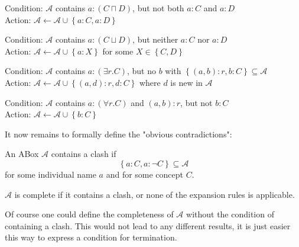 \begin{mdframed}[frametitle = expansion rules]
	\begin{mdframed}[frametitle= The $\sqcap$-rule]
		Condition: $\mathcal{A}$ contains $a: (C \sqcap D)$, but not both $a:C$ and $a:D$ \\
		Action: $\mathcal{A} \leftarrow \mathcal{A} \cup \left\{ a:C, a:D \right\} $
	\end{mdframed}
	\begin{mdframed}[frametitle= The $\sqcup$-rule]
		Condition: $\mathcal{A}$ contains $a: (C \sqcup D)$, but neither $a:C$ nor $a:D$\\
		Action: $\mathcal{A} \leftarrow \mathcal{A} \cup \left\{ a:X \right\} $ for some $X \in \left\{ C,D \right\}$
	\end{mdframed}
	\begin{mdframed}[frametitle= The $\exists$-rule]
		Condition: $\mathcal{A}$ contains $a:(\exists r.C)$, but no $b$ with $\left\{ (a,b) :r, b:C \right\} \subseteq \mathcal{A}$ \\
		Action: $\mathcal{A} \leftarrow \mathcal{A} \cup \left\{ (a,d):r, d:C \right\} $ where $d$ is new in $\mathcal{A}$
	\end{mdframed}
	\begin{mdframed}[frametitle= The $\forall$-rule]
		Condition: $\mathcal{A}$ contains $a:(\forall r.C)$ and $(a,b):r$, but not $b:C$\\
		Action: $\mathcal{A} \leftarrow \mathcal{A} \cup \left\{ b:C\right\} $
	\end{mdframed}
\end{mdframed}

It now remains to formally define the "obvious contradictions":
\begin{definition}
	An ABox $\mathcal{A}$ contains a clash if
	\[
	\left\{ a:C, a: \neg C \right\} \subseteq \mathcal{A}
	\]
	for some individual name $a$ and for some concept $C$.

	$\mathcal{A}$ is complete if it contains a clash, or none of the expansion rules is applicable.
\end{definition}
\begin{note}
	Of course one could define the completeness of $\mathcal{A}$ without the condition of containing a clash.
	This would not lead to any different results, it is just easier this way to express a condition for termination.
\end{note}
